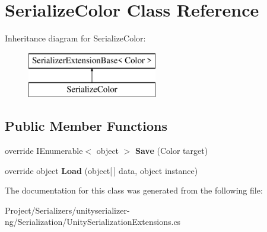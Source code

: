 \hypertarget{class_serialize_color}{}\section{Serialize\+Color Class Reference}
\label{class_serialize_color}
Inheritance diagram for Serialize\+Color\+:\begin{figure}[H]
\begin{center}
\leavevmode
\includegraphics[height=2.000000cm]{class_serialize_color}
\end{center}
\end{figure}
\subsection*{Public Member Functions}
\begin{DoxyCompactItemize}
\item 
\mbox{\label{class_serialize_color_aab21b448e72e3474845cc3120ea4e34c}} 
override I\+Enumerable$<$ object $>$ {\bfseries Save} (Color target)
\item 
\mbox{\label{class_serialize_color_ae959d6e7f4466e158d7ee4d23849a7ca}} 
override object {\bfseries Load} (object\mbox{[}$\,$\mbox{]} data, object instance)
\end{DoxyCompactItemize}


The documentation for this class was generated from the following file\+:\begin{DoxyCompactItemize}
\item 
Project/\+Serializers/unityserializer-\/ng/\+Serialization/Unity\+Serialization\+Extensions.\+cs\end{DoxyCompactItemize}
